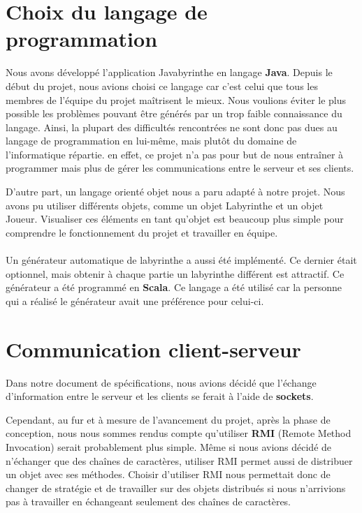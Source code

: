 \section{Choix du langage de programmation}

	Nous avons développé l'application Javabyrinthe en langage \textbf{Java}. Depuis le début du projet, nous avions choisi ce langage car c'est celui que tous les membres de l'équipe du projet maîtrisent le mieux. Nous voulions éviter le plus possible les problèmes pouvant être générés par un trop faible connaissance du langage. Ainsi, la plupart des difficultés rencontrées ne sont donc pas dues au langage de programmation en lui-même, mais plutôt du domaine de l'informatique répartie. en effet, ce projet n'a pas pour but de nous entraîner à programmer mais plus de gérer les communications entre le serveur et ses clients.

	D'autre part, un langage orienté objet nous a paru adapté à notre projet. Nous avons pu utiliser différents objets, comme un objet Labyrinthe et un objet Joueur. Visualiser ces éléments en tant qu'objet est beaucoup plus simple pour comprendre le fonctionnement du projet et travailler en équipe.

	\paragraph*{}
	Un générateur automatique de labyrinthe a aussi été implémenté. Ce dernier était optionnel, mais obtenir à chaque partie un labyrinthe différent est attractif. Ce générateur a été programmé en \textbf{Scala}. Ce langage a été utilisé car la personne qui a réalisé le générateur avait une préférence pour celui-ci.


\section{Communication client-serveur}

	Dans notre document de spécifications, nous avions décidé que l'échange d'information entre le serveur et les clients se ferait à l'aide de \textbf{sockets}.

	Cependant, au fur et à mesure de l'avancement du projet, après la phase de conception, nous nous sommes rendus compte qu'utiliser \textbf{RMI} (Remote Method Invocation) serait probablement plus simple. Même si nous avions décidé de n'échanger que des chaînes de caractères, utiliser RMI permet aussi de distribuer un objet avec ses méthodes. Choisir d'utiliser RMI nous permettait donc de changer de stratégie et de travailler sur des objets distribués si nous n'arrivions pas à travailler en échangeant seulement des chaînes de caractères.

